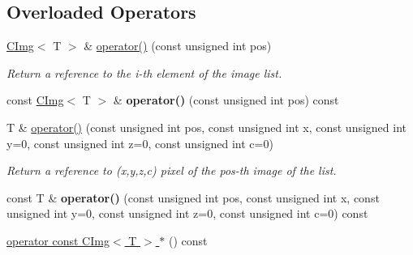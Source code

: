 \subsection*{Overloaded Operators}
\label{_amgrp10ba48134b3a5986e7dba07127eb6a73}
 \begin{DoxyCompactItemize}
\item 
\hypertarget{structcimg__library_1_1CImgList_ac420a93062b5621e0345eb3f658fbc94}{
\hyperlink{structcimg__library_1_1CImg}{CImg}$<$ T $>$ \& \hyperlink{structcimg__library_1_1CImgList_ac420a93062b5621e0345eb3f658fbc94}{operator()} (const unsigned int pos)}
\label{structcimg__library_1_1CImgList_ac420a93062b5621e0345eb3f658fbc94}

\begin{DoxyCompactList}\small\item\em Return a reference to the i-\/th element of the image list. \item\end{DoxyCompactList}\item 
\hypertarget{structcimg__library_1_1CImgList_a631a753b1a6a74cebecae88a97115c84}{
const \hyperlink{structcimg__library_1_1CImg}{CImg}$<$ T $>$ \& {\bfseries operator()} (const unsigned int pos) const }
\label{structcimg__library_1_1CImgList_a631a753b1a6a74cebecae88a97115c84}

\item 
\hypertarget{structcimg__library_1_1CImgList_a282dc04b257673a1c4bd2627153a35ad}{
T \& \hyperlink{structcimg__library_1_1CImgList_a282dc04b257673a1c4bd2627153a35ad}{operator()} (const unsigned int pos, const unsigned int x, const unsigned int y=0, const unsigned int z=0, const unsigned int c=0)}
\label{structcimg__library_1_1CImgList_a282dc04b257673a1c4bd2627153a35ad}

\begin{DoxyCompactList}\small\item\em Return a reference to (x,y,z,c) pixel of the pos-\/th image of the list. \item\end{DoxyCompactList}\item 
\hypertarget{structcimg__library_1_1CImgList_ac19566ff57426635086a5c681f4dae47}{
const T \& {\bfseries operator()} (const unsigned int pos, const unsigned int x, const unsigned int y=0, const unsigned int z=0, const unsigned int c=0) const }
\label{structcimg__library_1_1CImgList_ac19566ff57426635086a5c681f4dae47}

\item 
\hypertarget{structcimg__library_1_1CImgList_aa984eefea21b860ca6f98ba049db3e1e}{
\hyperlink{structcimg__library_1_1CImgList_aa984eefea21b860ca6f98ba049db3e1e}{operator const CImg$<$ T $>$ $\ast$} () const }
\label{structcimg__library_1_1CImgList_aa984eefea21b860ca6f98ba049db3e1e}


\end{DoxyCompactItemize}
